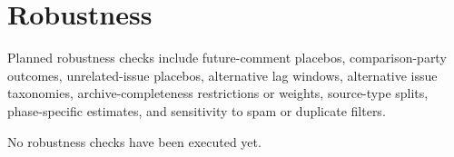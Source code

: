 \section{Robustness}\label{sec:robustness}

Planned robustness checks include future-comment placebos, comparison-party outcomes, unrelated-issue placebos, alternative lag windows, alternative issue taxonomies, archive-completeness restrictions or weights, source-type splits, phase-specific estimates, and sensitivity to spam or duplicate filters.

No robustness checks have been executed yet.
